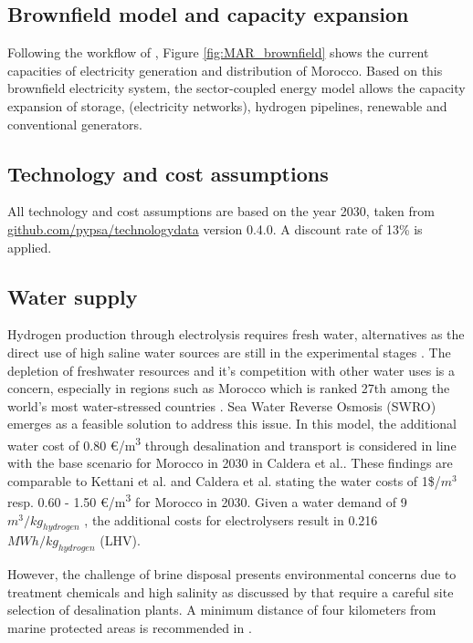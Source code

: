 \subsection*{Brownfield model and capacity expansion}
\label{brownfield_model}
Following the workflow of \cite{Parzen2023}, Figure \ref{fig:MAR_brownfield} shows the current capacities of electricity generation and distribution of Morocco. Based on this brownfield electricity system, the sector-coupled energy model allows the capacity expansion of storage, (electricity networks), hydrogen pipelines, renewable and conventional generators.

\subsection*{Technology and cost assumptions}
\label{subsec:tech_assump}
All technology and cost assumptions are based on the year 2030, taken from \href{https://github.com/pypsa/technologydata}{github.com/pypsa/technologydata} version 0.4.0. A discount rate of 13\% is applied.


\subsection*{Water supply}
\label{subsec:water_supply}
Hydrogen production through electrolysis requires fresh water, alternatives as the direct use of high saline water sources are still in the experimental stages \cite{Tong2020}. The depletion of freshwater resources and it's competition with other water uses is a concern, especially in regions such as Morocco which is ranked 27th among the world's most water-stressed countries \cite{Maddocks2015}. 
Sea Water Reverse Osmosis (SWRO) emerges as a feasible solution to address this issue. In this model, the additional water cost of 0.80 €/\si{\cubic\metre} through desalination and transport is considered in line with the base scenario for Morocco in 2030 in Caldera et al.\cite{Caldera2020}. These findings are comparable to Kettani et al.\cite{Kettani2020} and Caldera et al.\cite{Caldera2016} stating the water costs of 1\$/$m^3$ resp. 0.60 - 1.50 €/\si{\cubic\metre} for Morocco in 2030. Given a water demand of 9~$m^3/kg_{hydrogen}$
\cite{Hampp2023}, the additional costs for electrolysers result in 0.216~$MWh/kg_{hydrogen}$ (LHV).

However, the challenge of brine disposal presents environmental concerns due to treatment chemicals and high salinity as discussed by \cite{Thomann2022, Dresp2019, Tonelli2023} that require a careful site selection of desalination plants. A minimum distance of four kilometers from marine protected areas is recommended in \cite{Thomann2022}.



